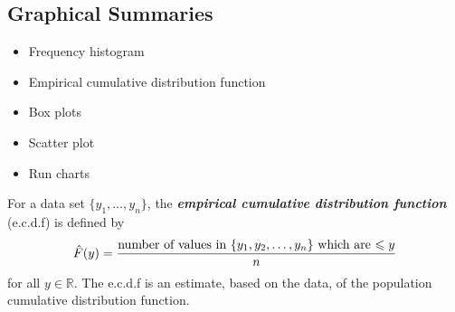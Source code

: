 \subsection{Graphical Summaries}

\begin{itemize}
    \item Frequency histogram
    \item Empirical cumulative distribution function
    \item Box plots
    \item Scatter plot
    \item Run charts
\end{itemize}
\begin{defbox}
    \begin{definition}
        For a data set $ \{y_1,\ldots ,y_n\} $, the \textbf{\emph{empirical cumulative distribution function}}
        (e.c.d.f) is defined by
        \[ \hat{F}(y)=\frac{\text{number of values in $ \{y_1,y_2,\ldots ,y_n\} $ which are $ \leqslant y $}}{n} \]
        for all $ y\in\mathbb{R} $.
        The e.c.d.f is an estimate, based on the data, of the population cumulative distribution function.
    \end{definition}
\end{defbox}
